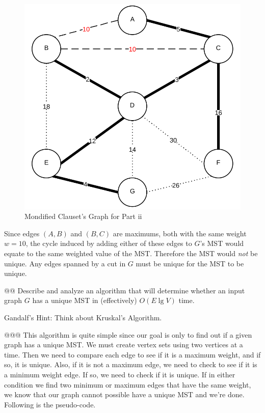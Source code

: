 \documentclass[10pt]{article}\usepackage[]{graphicx}\usepackage[]{xcolor}
\begin{document}
\begin{easylist}[enumerate]
    \begin{figure}[H]
        \centering
        \includegraphics[scale=0.5]{./img/ps8/3cc.png}
        \caption{Mondified Clauset's Graph for Part ii}
        \label{fig:3bb}
    \end{figure}

    Since edges $(A, B)$ and $(B, C)$ are maximums, both with the same weight $w=10$, the cycle induced by adding either
    of these edges to $G$'s MST would equate to the same weighted value of the MST. Therefore the MST would \textit{not}
    be unique. Any edges spanned by a cut in $G$ must be unique for the MST to be unique.

    @@ Describe and analyze an algorithm that will determine whether an input graph $G$ has a unique MST in
    (effectively) $O(E \lg V)$ time.

    Gandalf's Hint: Think about Kruskal's Algorithm.

    @@@ This algorithm is quite simple since our goal is only to find out if a given graph has a unique MST. We must
    create vertex sets using two vertices at a time. Then we need to compare each edge to see if it is a maximum weight,
    and if so, it is unique. Also, if it is not a maximum edge, we need to check to see if it is a minimum weight edge.
    If so, we need to check if it is unique. If in either condition we find two minimum or maximum edges that have the
    same weight, we know that our graph cannot possible have a unique MST and we're done. Following is the pseudo-code.


\end{easylist}
\end{document}
